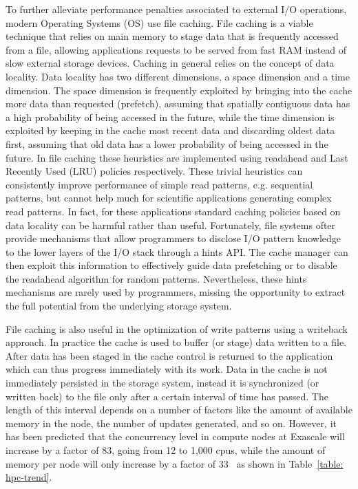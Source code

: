 To further alleviate performance penalties associated to external I/O operations, modern Operating Systems (OS) use file caching. File caching is a viable technique that relies on main memory to stage data
that is frequently accessed from a file, allowing applications requests to be served from fast RAM instead of slow external storage devices. Caching in general relies on the concept of data locality. Data locality
has two different dimensions, a space dimension and a time dimension. The space dimension is frequently exploited by bringing into the cache more data than requested (prefetch), assuming that spatially contiguous
data has a high probability of being accessed in the future, while the time dimension is exploited by keeping in the cache most recent data and discarding oldest data first, assuming that old data has a lower
probability of being accessed in the future. In file caching these heuristics are implemented using readahead and Last Recently Used (LRU) policies respectively.
These trivial heuristics can consistently improve performance of simple read patterns, e.g. sequential patterns, but cannot help much for scientific applications generating complex read patterns. In fact,
for these applications standard caching policies based on data locality can be harmful rather than useful. Fortunately, file systems ofter provide mechanisms that allow programmers to disclose I/O pattern 
knowledge to the lower layers of the I/O stack through a hints API. The cache manager can then exploit this information to effectively guide data prefetching or to disable the readahead algorithm for random 
patterns. Nevertheless, these hints mechanisms are rarely used by programmers, missing the opportunity to extract the full potential from the underlying storage system.

File caching is also useful in the optimization of write patterns using a writeback approach. In practice the cache is used to buffer (or stage) data written to a file. After data has been staged in the cache
control is returned to the application which can thus progress immediately with its work. Data in the cache is not immediately persisted in the storage system, instead it is synchronized (or written back) to 
the file only after a certain interval of time has passed. The length of this interval depends on a number of factors like the amount of available memory in the node, the number of updates generated, and so on.
However, it has been predicted that the concurrency level in compute nodes at Exascale will increase by a factor of 83, going from 12 to 1,000 cpus, while the amount of memory per node will only increase by 
a factor of 33~\cite{ASCAC2010} as shown in Table~\ref{table: hpc-trend}.

